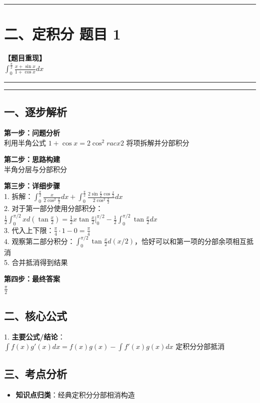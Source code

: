 ﻿\documentclass[12pt, a4paper]{ctexart}
\newcommand{\TopSeparator}{
    \par\noindent\rule{\textwidth}{1.5pt}\vspace{0.5em}
}
\newcommand{\AnalysisSeparator}{
    \par\noindent\rule{\textwidth}{0.5pt}\vspace{0.2em}\hrule\vspace{0.5em}
}
\newenvironment{RedAnalysis}{
    \par
    \color{red} 
}{
    \par
    \color{black} 
}
\begin{document}
\vspace{2em}

\TopSeparator
\section*{二、定积分 题目 1}

\textbf{【题目重现】} \\
$\int_{0}^{\frac{\pi}{2}} \frac{x+\sin x}{1+\cos x} dx$

\AnalysisSeparator

\begin{RedAnalysis}

	\subsection*{一、逐步解析}

	\textbf{第一步：问题分析} \\
	利用半角公式 $1+\cos x = 2\cos^2
		rac{x}{2}$ 将项拆解并分部积分

	\textbf{第二步：思路构建} \\
	半角分层与分部积分

	\textbf{第三步：详细步骤} \\
	1. 拆解：$\int_{0}^{\frac{\pi}{2}} \frac{x}{2\cos^2\frac{x}{2}} dx + \int_{0}^{\frac{\pi}{2}} \frac{2\sin\frac{x}{2}\cos\frac{x}{2}}{2\cos^2\frac{x}{2}} dx$ \\ 
	2. 对于第一部分使用分部积分：$\frac{1}{2}\int_0^{\pi/2} x d(\tan\frac{x}{2}) = \frac{1}{2}x\tan\frac{x}{2}\Big|_0^{\pi/2} - \frac{1}{2}\int_0^{\pi/2} \tan\frac{x}{2} dx$ \\ 
	3. 代入上下限：$\frac{\pi}{4} \cdot 1 - 0 = \frac{\pi}{4}$ \\ 
	4. 观察第二部分积分：$\int_{0}^{\pi/2} \tan\frac{x}{2} d(x/2)$，恰好可以和第一项的分部余项相互抵消 \\ 
	5. 合并抵消得到结果

	\textbf{第四步：最终答案} \\
	$\frac{\pi}{2}$

	\subsection*{二、核心公式}
	1. \textbf{主要公式/结论}：$\int f(x)g'(x)dx = f(x)g(x) - \int f'(x)g(x)dx \text{ 定积分分部抵消}$

	\subsection*{三、考点分析}
	\begin{itemize}
		\item \textbf{知识点归类}：经典定积分分部相消构造
	\end{itemize}

\end{RedAnalysis}
\end{document}
